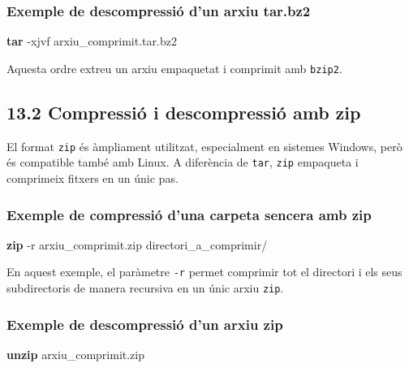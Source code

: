 \documentclass[
  12 pt,
  a4paper,
]{article}
\newenvironment{Shaded}{\begin{snugshade}}{\end{snugshade}}
\newcommand{\AttributeTok}[1]{\textcolor[rgb]{0.13,0.29,0.53}{#1}}
\newcommand{\FunctionTok}[1]{\textcolor[rgb]{0.13,0.29,0.53}{\textbf{#1}}}
\newcommand{\NormalTok}[1]{#1}
\begin{document}
\subsubsection{Exemple de descompressió d'un arxiu
tar.bz2}\label{exemple-de-descompressiuxf3-dun-arxiu-tar.bz2}

\begin{Shaded}
\begin{Highlighting}[]
\FunctionTok{tar} \AttributeTok{{-}xjvf}\NormalTok{ arxiu\_comprimit.tar.bz2}
\end{Highlighting}
\end{Shaded}

Aquesta ordre extreu un arxiu empaquetat i comprimit amb \texttt{bzip2}.

\subsection{13.2 Compressió i descompressió amb
zip}\label{compressiuxf3-i-descompressiuxf3-amb-zip}

El format \texttt{zip} és àmpliament utilitzat, especialment en sistemes
Windows, però és compatible també amb Linux. A diferència de
\texttt{tar}, \texttt{zip} empaqueta i comprimeix fitxers en un únic
pas.

\subsubsection{Exemple de compressió d'una carpeta sencera amb
zip}\label{exemple-de-compressiuxf3-duna-carpeta-sencera-amb-zip}

\begin{Shaded}
\begin{Highlighting}[]
\FunctionTok{zip} \AttributeTok{{-}r}\NormalTok{ arxiu\_comprimit.zip directori\_a\_comprimir/}
\end{Highlighting}
\end{Shaded}

En aquest exemple, el paràmetre \texttt{-r} permet comprimir tot el
directori i els seus subdirectoris de manera recursiva en un únic arxiu
\texttt{zip}.

\subsubsection{Exemple de descompressió d'un arxiu
zip}\label{exemple-de-descompressiuxf3-dun-arxiu-zip}

\begin{Shaded}
\begin{Highlighting}[]
\FunctionTok{unzip}\NormalTok{ arxiu\_comprimit.zip}
\end{Highlighting}
\end{Shaded}
\end{document}
